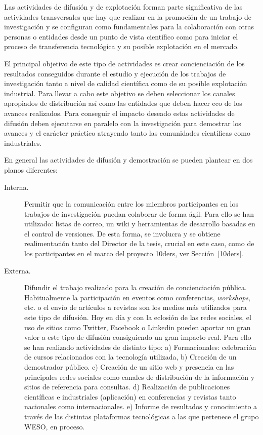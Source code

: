 Las actividades de difusión y de explotación forman parte significativa
de las actividades transversales que hay que realizar en la promoción
de un trabajo de investigación y se configuran como fundamentales
para la colaboración con otras personas o entidades desde un punto
de vista científico como para iniciar el proceso de transferencia
tecnológica y su posible explotación en el mercado.

El principal objetivo de este tipo de actividades es crear
concienciación de los resultados conseguidos durante
el estudio y ejecución de los trabajos de investigación
tanto a nivel de calidad científica como de su 
posible explotación industrial. Para llevar a cabo este objetivo
se deben seleccionar los canales apropiados de distribución así 
como las entidades que deben hacer eco de los avances realizados. Para conseguir
el impacto deseado estas actividades de difusión deben ejecutarse en paralelo
con la investigación para demostrar los avances y el carácter práctico
atrayendo tanto las comunidades científicas como industriales.

En general las actividades de difusión y demostración se pueden plantear
en dos planos diferentes:

\begin{description}
 \item [Interna.] Permitir que la comunicación entre los miembros participantes
en los trabajos de investigación puedan colaborar de forma ágil. Para ello 
se han utilizado: listas de correo, un wiki y herramientas de desarrollo
basadas en el control de versiones. De esta forma, se involucra y se obtiene
realimentación tanto del Director de la tesis, crucial en este caso, como 
de los participantes en el marco del proyecto \gls{10ders}, ver Sección~\ref{10ders}.
\item [Externa.] Difundir el trabajo realizado para la creación de concienciación
pública. Habitualmente la participación en eventos como conferencias, \textit{workshops}, etc.
o el envío de artículos a revistas son los medios más utilizados para este tipo de difusión.
Hoy en día y con la eclosión de las redes sociales, el uso de sitios como Twitter, Facebook o
Linkedin pueden aportar un gran valor a este tipo de difusión consiguiendo un gran impacto
real. Para ello se han realizado actividades de distinto tipo: a) Formacionales:
celebración de cursos relacionados con la tecnología utilizada, b)
Creación de un demostrador público. c) Creación de un sitio web y presencia en
las principales redes sociales como canales de distribución de la información y
sitios de referencia para consultas. d) Realización de publicaciones científicas
e industriales (aplicación) en conferencias y revistas tanto nacionales como
internacionales. e) Informe de resultados y conocimiento a través de las
distintas plataformas tecnológicas a las que pertenece el grupo \gls{WESO}, en proceso.
\end{description}

